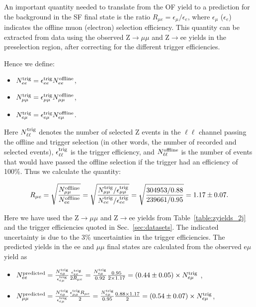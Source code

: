 An important quantity needed to translate from the OF yield to a prediction for the background in the SF final state is the ratio 
$R_{\mu e} = \epsilon_\mu / \epsilon_e$, where $\epsilon_\mu$ ($\epsilon_e$) indicates the offline muon (electron) selection efficiency. 
This quantity can be extracted from data using the observed Z$\to\mu\mu$ and Z$\to$ee yields in the preselection region, after correcting 
for the different trigger efficiencies.

Hence we define:

\begin{itemize}
\item $N_{ee}^{\rm{trig}} = \epsilon_{ee}^{\rm{trig}}N_{ee}^{\rm{offline}}$,
\item $N_{\mu\mu}^{\rm{trig}} = \epsilon_{\mu\mu}^{\rm{trig}}N_{\mu\mu}^{\rm{offline}}$,
\item $N_{e\mu}^{\rm{trig}} = \epsilon_{e\mu}^{\rm{trig}}N_{e\mu}^{\rm{offline}}$.
\end{itemize}
 
Here $N_{\ell\ell}^{\rm{trig}}$ denotes the number of selected Z events in the $\ell\ell$ channel passing the offline and trigger selection
(in other words, the number of recorded and selected events), $\epsilon_{\ell\ell}^{\rm{trig}}$ is the trigger efficiency, and 
$N_{\ell\ell}^{\rm{offline}}$ is the number of events that would have passed the offline selection if the trigger had an efficiency of 100\%.
Thus we calculate the quantity:

\begin{equation}
R_{\mu e} = \sqrt{\frac{N_{\mu\mu}^{\rm{offline}}}{N_{ee}^{\rm{offline}}}} = \sqrt{\frac{N_{\mu\mu}^{\rm{trig}}/\epsilon_{\mu\mu}^{\rm{trig}}}{N_{ee}^{\rm{trig}}/\epsilon_{ee}^{\rm{trig}}}} 
= \sqrt{\frac{304953/0.88}{239661/0.95}} = 1.17\pm0.07.
\end{equation}

Here we have used the Z$\to\mu\mu$ and Z$\to$ee yields from Table~\ref{table:zyields_2j} and the trigger efficiencies quoted in Sec.~\ref{sec:datasets}.
The indicated uncertainty is due to the 3\% uncertainties in the trigger efficiencies. %
The predicted yields in the ee and $\mu\mu$ final states are calculated from the observed e$\mu$ yield as

\begin{itemize}
\item $N_{ee}^{\rm{predicted}}    = \frac {N_{e\mu}^{\rm{trig}}} {\epsilon_{e\mu}^{\rm{trig}}} \frac {\epsilon_{ee}^{\rm{trig}}} {2 R_{\mu e}} 
= \frac{N_{e\mu}^{\rm{trig}}}{0.92}\frac{0.95}{2\times1.17} = (0.44\pm0.05) \times N_{e\mu}^{\rm{trig}}$ ,
\item $N_{\mu\mu}^{\rm{predicted}} = \frac {N_{e\mu}^{\rm{trig}}} {\epsilon_{e\mu}^{\rm{trig}}} \frac {\epsilon_{\mu\mu}^{\rm{trig}} R_{\mu e}}  {2}
= \frac {N_{e\mu}^{\rm{trig}}} {0.95} \frac {0.88 \times 1.17}{2} = (0.54\pm0.07) \times N_{e\mu}^{\rm{trig}}$,
\end{itemize}


